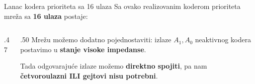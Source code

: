 \begin{frame}[t,label=03-s021]{Lanac kodera prioriteta sa 16 ulaza}
\setlength{\parskip}{0pt}
Sa ovako realizovanim koderom prioriteta mreža sa \textbf{16 ulaza} postaje:
\par\vspace{1mm}
\begin{columns}[c,onlytextwidth]
\begin{column}{.47\textwidth}\centering

\end{column}
\begin{column}{.50\textwidth}
Mrežu možemo dodatno pojednostaviti: izlaze \(A_1,A_0\) neaktivnog kodera
postavimo u \textcolor{DEisticanje}{\textbf{stanje visoke impedanse}}.
\par\vspace{2mm}
Tada odgovarajuće izlaze možemo \textbf{direktno spojiti},
pa nam \textcolor{DEisticanje}{\textbf{četvoroulazni ILI gejtovi nisu potrebni}}.
\end{column}
\end{columns}
\end{frame}
